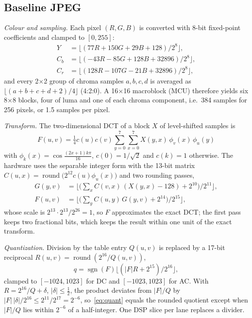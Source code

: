 \subsection{Baseline JPEG}
\textit{Colour and sampling.} Each pixel $(R, G, B)$ is converted with 8-bit fixed-point coefficients and clamped to $[0, 255]$:
\begin{equation}
\begin{aligned}
Y  &= \lfloor (77R + 150G + 29B + 128) / 2^8 \rfloor,\\
C_b &= \lfloor (-43R - 85G + 128B + 32896) / 2^8 \rfloor,\\
C_r &= \lfloor (128R - 107G - 21B + 32896) / 2^8 \rfloor,
\end{aligned}
\label{eq:ycc}
\end{equation}
and every 2$\times$2 group of chroma samples $a, b, c, d$ is averaged as $\lfloor (a + b + c + d + 2)/4 \rfloor$ (4:2:0). A 16$\times$16 macroblock (MCU) therefore yields six 8$\times$8 blocks, four of luma and one of each chroma component, i.e.\ 384 samples for 256 pixels, or 1.5 samples per pixel.

\textit{Transform.} The two-dimensional DCT of a block $X$ of level-shifted samples is
\begin{equation}
F(u, v) = \tfrac{1}{4} c(u) c(v) \sum_{y=0}^{7} \sum_{x=0}^{7} X(y, x)\, \phi_v(x)\, \phi_u(y)
\label{eq:dctexact}
\end{equation}
with $\phi_k(x) = \cos\frac{(2x+1)k\pi}{16}$, $c(0) = 1/\sqrt2$ and $c(k) = 1$ otherwise. The hardware uses the separable integer form with the 13-bit matrix $C(u, x) = \operatorname{round}\bigl(2^{12} c(u) \phi_u(x)\bigr)$ and two rounding passes,
\begin{equation}
\begin{aligned}
G(y, v) &= \bigl\lfloor \bigl(\textstyle\sum_{x} C(v, x)\,(X(y, x) {-} 128) + 2^{10}\bigr) / 2^{11} \bigr\rfloor,\\
F(u, v) &= \bigl\lfloor \bigl(\textstyle\sum_{y} C(u, y)\,G(y, v) + 2^{14}\bigr) / 2^{15} \bigr\rfloor,
\end{aligned}
\label{eq:dct}
\end{equation}
whose scale is $2^{13} \cdot 2^{13} / 2^{26} = 1$, so $F$ approximates the exact DCT; the first pass keeps two fractional bits, which keeps the result within one unit of the exact transform.

\textit{Quantization.} Division by the table entry $Q(u, v)$ is replaced by a 17-bit reciprocal $R(u, v) = \operatorname{round}(2^{16}/Q(u,v))$,
\begin{equation}
q = \operatorname{sgn}(F) \bigl\lfloor (|F| R + 2^{15}) / 2^{16} \bigr\rfloor,
\label{eq:quant}
\end{equation}
clamped to $[-1024, 1023]$ for DC and $[-1023, 1023]$ for AC. With $R = 2^{16}/Q + \delta$, $|\delta| \le \tfrac12$, the product deviates from $|F|/Q$ by $|F|\,|\delta|/2^{16} \le 2^{11}/2^{17} = 2^{-6}$, so~\eqref{eq:quant} equals the rounded quotient except when $|F|/Q$ lies within $2^{-6}$ of a half-integer. One DSP slice per lane replaces a divider.

